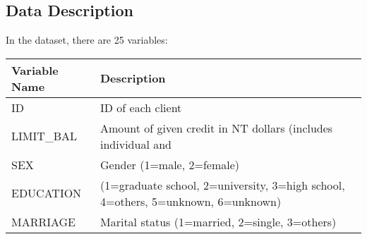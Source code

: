 \documentclass[]{article}
\begin{document}
\subsection{Data Description}\label{data-description}

In the dataset, there are 25 variables:

\begin{longtable}[]{@{}ll@{}}
\toprule
\begin{minipage}[b]{0.24\columnwidth}\raggedright\strut
Variable Name\strut
\end{minipage} & \begin{minipage}[b]{0.70\columnwidth}\raggedright\strut
Description\strut
\end{minipage}\tabularnewline
\midrule
\endhead
\begin{minipage}[t]{0.24\columnwidth}\raggedright\strut
ID\strut
\end{minipage} & \begin{minipage}[t]{0.70\columnwidth}\raggedright\strut
ID of each client\strut
\end{minipage}\tabularnewline
\begin{minipage}[t]{0.24\columnwidth}\raggedright\strut
LIMIT\_BAL\strut
\end{minipage} & \begin{minipage}[t]{0.70\columnwidth}\raggedright\strut
Amount of given credit in NT dollars (includes individual and\strut
\end{minipage}\tabularnewline
\begin{minipage}[t]{0.24\columnwidth}\raggedright\strut
SEX\strut
\end{minipage} & \begin{minipage}[t]{0.70\columnwidth}\raggedright\strut
Gender (1=male, 2=female)\strut
\end{minipage}\tabularnewline
\begin{minipage}[t]{0.24\columnwidth}\raggedright\strut
EDUCATION\strut
\end{minipage} & \begin{minipage}[t]{0.70\columnwidth}\raggedright\strut
(1=graduate school, 2=university, 3=high school, 4=others, 5=unknown,
6=unknown)\strut
\end{minipage}\tabularnewline
\begin{minipage}[t]{0.24\columnwidth}\raggedright\strut
MARRIAGE\strut
\end{minipage} & \begin{minipage}[t]{0.70\columnwidth}\raggedright\strut
Marital status (1=married, 2=single, 3=others)\strut

\end{minipage}
\end{longtable}
\end{document}

